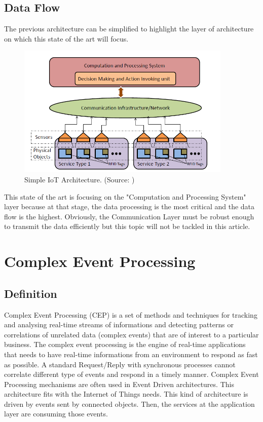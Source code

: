 \documentclass[11pt]{article}
\begin{document}
\subsection{Data Flow}

The previous architecture can be simplified to highlight the layer of architecture on which this state of the art will focus.
\newline
\begin{figure}[h]
	\includegraphics[width=\textwidth,height=180pt]{assets/Basic_IOT_Architecture.png} 
	\caption[Simple IoT Architecture]{Simple IoT Architecture. (Source: \cite{Future-Internet-The-Internet-of-Things})}
	\label{fig:simpleArchitecture}
\end{figure}

This state of the art is focusing on the "Computation and Processing System" layer because at that stage, the data processing is the most critical and the data flow is the highest. Obviously, the Communication Layer must be robust enough to transmit the data efficiently but this topic will not be tackled in this article.


\section{Complex Event Processing} \label{cep}

\subsection{Definition}

Complex Event Processing (CEP) is a set of methods and techniques for tracking
and analysing real-time streams of informations and detecting patterns or correlations
of unrelated data (complex events) that are of interest to a particular
business. \cite{1} The complex event processing is the engine of real-time applications that needs to have real-time informations from an environment to respond as fast as possible. A standard Request/Reply with synchronous processes cannot correlate different type of events and respond in a timely manner. Complex Event Processing mechanisms are often used in Event Driven architectures. This architecture fits with the Internet of Things needs. This kind of architecture is driven by events sent by connected objects. Then, the services at the application layer are consuming those events.
\end{document}
